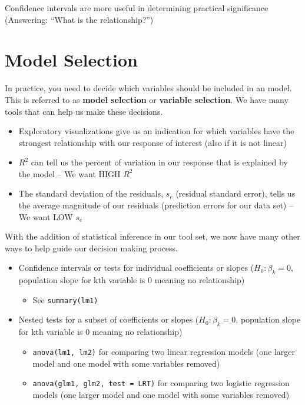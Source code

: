 \documentclass[
]{book}
\providecommand{\tightlist}{%
  \setlength{\itemsep}{0pt}\setlength{\parskip}{0pt}}
\begin{document}
Confidence intervals are more useful in determining practical significance (Answering: ``What is the relationship?'')

\hypertarget{model-selection}{%
\section{Model Selection}\label{model-selection}}

In practice, you need to decide which variables should be included in an model. This is referred to as \textbf{model selection} or \textbf{variable selection}. We have many tools that can help us make these decisions.

\begin{itemize}
\tightlist
\item
  Exploratory visualizations give us an indication for which variables have the strongest relationship with our response of interest (also if it is not linear)
\item
  \(R^2\) can tell us the percent of variation in our response that is explained by the model -- We want HIGH \(R^2\)
\item
  The standard deviation of the residuals, \(s_e\) (residual standard error), tells us the average magnitude of our residuals (prediction errors for our data set) -- We want LOW \(s_e\)
\end{itemize}

With the addition of statistical inference in our tool set, we now have many other ways to help guide our decision making process.

\begin{itemize}
\tightlist
\item
  Confidence intervals or tests for individual coefficients or slopes (\(H_0: \beta_k = 0\), population slope for kth variable is 0 meaning no relationship)

  \begin{itemize}
  \tightlist
  \item
    See \texttt{summary(lm1)}
  \end{itemize}
\item
  Nested tests for a subset of coefficients or slopes (\(H_0: \beta_k = 0\), population slope for kth variable is 0 meaning no relationship)

  \begin{itemize}
  \tightlist
  \item
    \texttt{anova(lm1,\ lm2)} for comparing two linear regression models (one larger model and one model with some variables removed)
  \item
    \texttt{anova(glm1,\ glm2,\ test\ =\ \textquotesingle{}LRT\textquotesingle{})} for comparing two logistic regression models (one larger model and one model with some variables removed)
  \end{itemize}
\end{itemize}
\end{document}
